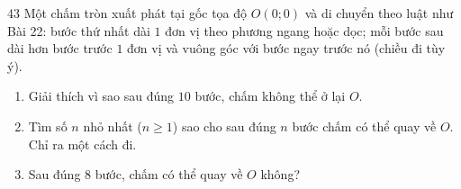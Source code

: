 \begin{probbox}{43}{}
Một chấm tròn xuất phát tại gốc tọa độ $O(0;0)$ và di chuyển theo luật như Bài 22: bước thứ nhất dài $1$ đơn vị theo phương ngang hoặc dọc; mỗi bước sau dài hơn bước trước $1$ đơn vị và vuông góc với bước ngay trước nó (chiều đi tùy ý).
\begin{enumerate}[label=\alph*),leftmargin=1.6em,itemsep=1pt]
\item Giải thích vì sao sau đúng $10$ bước, chấm không thể ở lại $O$.
\item Tìm số $n$ nhỏ nhất ($n\ge 1$) sao cho sau đúng $n$ bước chấm có thể quay về $O$. Chỉ ra một cách đi.
\item Sau đúng $8$ bước, chấm có thể quay về $O$ không?
\end{enumerate}
\end{probbox}
